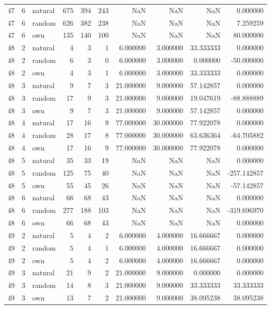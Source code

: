 \begin{table}[htbp]
\begin{tabular}{rrlrrrrrrr}
47 & 6 & natural & 675 & 394 & 243 & NaN & NaN & NaN & 0.000000 \\
47 & 6 & random & 626 & 382 & 238 & NaN & NaN & NaN & 7.259259 \\
47 & 6 & own & 135 & 140 & 100 & NaN & NaN & NaN & 80.000000 \\
48 & 2 & natural & 4 & 3 & 1 & 6.000000 & 3.000000 & 33.333333 & 0.000000 \\
48 & 2 & random & 6 & 3 & 0 & 6.000000 & 3.000000 & 0.000000 & -50.000000 \\
48 & 2 & own & 4 & 3 & 1 & 6.000000 & 3.000000 & 33.333333 & 0.000000 \\
48 & 3 & natural & 9 & 7 & 3 & 21.000000 & 9.000000 & 57.142857 & 0.000000 \\
48 & 3 & random & 17 & 9 & 3 & 21.000000 & 9.000000 & 19.047619 & -88.888889 \\
48 & 3 & own & 9 & 7 & 3 & 21.000000 & 9.000000 & 57.142857 & 0.000000 \\
48 & 4 & natural & 17 & 16 & 9 & 77.000000 & 30.000000 & 77.922078 & 0.000000 \\
48 & 4 & random & 28 & 17 & 8 & 77.000000 & 30.000000 & 63.636364 & -64.705882 \\
48 & 4 & own & 17 & 16 & 9 & 77.000000 & 30.000000 & 77.922078 & 0.000000 \\
48 & 5 & natural & 35 & 33 & 19 & NaN & NaN & NaN & 0.000000 \\
48 & 5 & random & 125 & 75 & 40 & NaN & NaN & NaN & -257.142857 \\
48 & 5 & own & 55 & 45 & 26 & NaN & NaN & NaN & -57.142857 \\
48 & 6 & natural & 66 & 68 & 43 & NaN & NaN & NaN & 0.000000 \\
48 & 6 & random & 277 & 188 & 103 & NaN & NaN & NaN & -319.696970 \\
48 & 6 & own & 66 & 68 & 43 & NaN & NaN & NaN & 0.000000 \\
49 & 2 & natural & 5 & 4 & 2 & 6.000000 & 4.000000 & 16.666667 & 0.000000 \\
49 & 2 & random & 5 & 4 & 1 & 6.000000 & 4.000000 & 16.666667 & 0.000000 \\
49 & 2 & own & 5 & 4 & 2 & 6.000000 & 4.000000 & 16.666667 & 0.000000 \\
49 & 3 & natural & 21 & 9 & 2 & 21.000000 & 9.000000 & 0.000000 & 0.000000 \\
49 & 3 & random & 14 & 8 & 3 & 21.000000 & 9.000000 & 33.333333 & 33.333333 \\
49 & 3 & own & 13 & 7 & 2 & 21.000000 & 9.000000 & 38.095238 & 38.095238 \\

\end{tabular}
\end{table}
